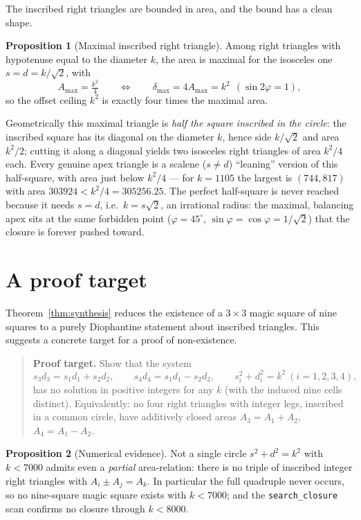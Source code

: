 \documentclass[11pt]{article}
\theoremstyle{definition}
\newtheorem{proposition}{Proposition}
\begin{document}
The inscribed right triangles are bounded in area, and the bound has a clean shape.

\begin{proposition}[Maximal inscribed right triangle]\label{prop:maxarea}
Among right triangles with hypotenuse equal to the diameter $k$, the area is
maximal for the isosceles one $s=d=k/\sqrt2$, with
\[
  A_{\max}=\tfrac{k^{2}}{4}
  \qquad\Longleftrightarrow\qquad
  \delta_{\max}=4A_{\max}=k^{2}\ \ (\sin2\varphi=1),
\]
so the offset ceiling $k^{2}$ is exactly four times the maximal area.
\end{proposition}

\noindent Geometrically this maximal triangle is \emph{half the square inscribed
in the circle}: the inscribed square has its diagonal on the diameter $k$, hence
side $k/\sqrt2$ and area $k^{2}/2$; cutting it along a diagonal yields two
isosceles right triangles of area $k^{2}/4$ each. Every genuine apex triangle is a
scalene ($s\ne d$) ``leaning'' version of this half-square, with area just below
$k^{2}/4$ --- for $k=1105$ the largest is $(744,817)$ with area $303924<k^{2}/4=
305256.25$. The perfect half-square is never reached because it needs
$s=d$, i.e.\ $k=s\sqrt2$, an irrational radius: the maximal, balancing apex sits at
the same forbidden point ($\varphi=45^\circ$, $\sin\varphi=\cos\varphi=1/\sqrt2$)
that the closure is forever pushed toward.

\section{A proof target}

Theorem~\ref{thm:synthesis} reduces the existence of a $3\times3$ magic square of
nine squares to a purely Diophantine statement about inscribed triangles. This
suggests a concrete target for a proof of non-existence.

\begin{quotation}
\noindent\textbf{Proof target.} Show that the system
\[
  s_3d_3=s_1d_1+s_2d_2,\qquad s_4d_4=s_1d_1-s_2d_2,\qquad
  s_i^{2}+d_i^{2}=k^{2}\ (i=1,2,3,4),
\]
has no solution in positive integers for any $k$ (with the induced nine cells
distinct). Equivalently: no four right triangles with integer legs, inscribed in a
common circle, have additively closed areas $A_3=A_1+A_2$, $A_4=A_1-A_2$.
\end{quotation}

\begin{proposition}[Numerical evidence]\label{prop:evidence}
Not a single circle $s^{2}+d^{2}=k^{2}$ with $k<7000$ admits even a \emph{partial}
area-relation: there is no triple of inscribed integer right triangles with
$A_i\pm A_j=A_k$. In particular the full quadruple never occurs, so no nine-square
magic square exists with $k<7000$; and the \texttt{search\_closure} scan confirms
no closure through $k<8000$.
\end{proposition}
\end{document}
